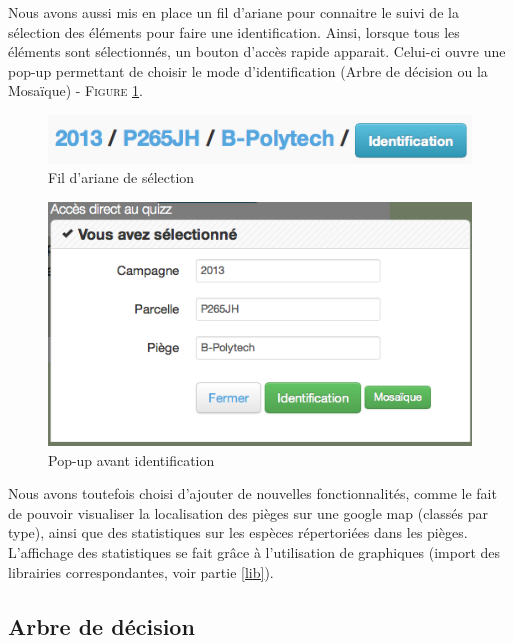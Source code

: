 \documentclass[twoside]{EPURapport}
\begin{document}
		Nous avons aussi mis en place un fil d'ariane pour connaitre le suivi de la sélection des éléments pour faire une identification. Ainsi, lorsque tous les éléments sont sélectionnés, un bouton d'accès rapide apparait. Celui-ci ouvre une pop-up permettant de choisir le mode d'identification (Arbre de décision ou la Mosaïque) - \textsc{Figure} \ref{img:popup-ident}.\\
		
		\begin{figure}[hbtp]
			\centering
			\includegraphics[scale=0.5]{images/seclection-cpp.png}
			\caption{Fil d'ariane de sélection}
		\end{figure}
		
		\begin{figure}[hbtp]
			\centering
			\includegraphics[scale=0.5]{images/popup-identification.png}
			\caption{Pop-up avant identification}
			\label{img:popup-ident}
		\end{figure}
		
		Nous avons toutefois choisi d'ajouter de nouvelles fonctionnalités, comme le fait de pouvoir visualiser la localisation des pièges sur une google map (classés par type), ainsi que des statistiques sur les espèces répertoriées dans les pièges. L'affichage des statistiques se fait grâce à l'utilisation de graphiques (import des librairies correspondantes, voir partie \ref{lib}).
		
		\subsection{Arbre de décision}
		
\end{document}
